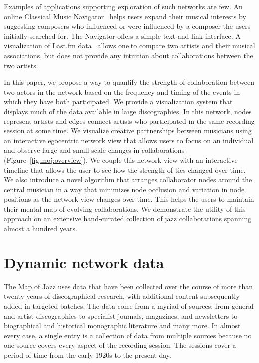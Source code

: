 \documentclass[12pt]{cmuthesis}
\begin{document}
  Examples of applications supporting exploration of such networks are few. An online Classical Music Navigator~\cite{Smith1999} helps users expand their musical interests by suggesting composers who influenced or were influenced by a composer the users initially searched for. The Navigator offers a simple text and link interface. A visualization of Last.fm data~\cite{Bieh-Zimmert2011} allows one to compare two artists and their musical associations, but does not provide any intuition about collaborations between the two artists.

  In this paper, we propose a way to quantify the strength of collaboration between two actors in the network based on the frequency and timing of the events in which they have both participated. We provide a visualization system that displays much of the data available in large discographies. In this network, nodes represent artists and edges connect artists who participated in the same recording session at some time. We visualize creative partnerships between musicians using an interactive egocentric network view that allows users to focus on an individual and observe large and small scale changes in collaborations (Figure~\ref{fig:moj:overview}). We couple this network view with an interactive timeline that allows the user to see how the strength of ties changed over time. We also introduce a novel algorithm that arranges collaborator nodes around the central musician in a way that minimizes node occlusion and variation in node positions as the network view changes over time. This helps the users to maintain their mental map of evolving collaborations. We demonstrate the utility of this approach on an extensive hand-curated collection of jazz collaborations spanning almost a hundred years.

\section{Dynamic network data}


  The Map of Jazz uses data that have been collected over the course of more than twenty years of discographical research, with additional content subsequently added in targeted batches. The data come from a myriad of sources: from general and artist discographies to specialist journals, magazines, and newsletters to biographical and historical monographic literature and many more. In almost every case, a single entry is a collection of data from multiple sources because no one source covers every aspect of the recording session. The sessions cover a period of time from the early 1920s to the present day.
\end{document}
